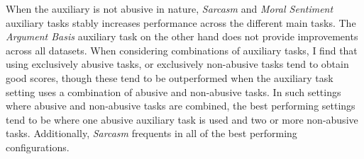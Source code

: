 When the auxiliary is not abusive in nature, \textit{Sarcasm} and \textit{Moral Sentiment} auxiliary tasks stably increases performance across the different main tasks.
The \textit{Argument Basis} auxiliary task on the other hand does not provide improvements across all datasets. 
When considering combinations of auxiliary tasks, I find that using exclusively abusive tasks, or exclusively non-abusive tasks tend to obtain good scores, though these tend to be outperformed when the auxiliary task setting uses a combination of abusive and non-abusive tasks.
In such settings where abusive and non-abusive tasks are combined, the best performing settings tend to be where one abusive auxiliary task is used and two or more non-abusive tasks.
Additionally, \textit{Sarcasm} frequents in all of the best performing configurations.

